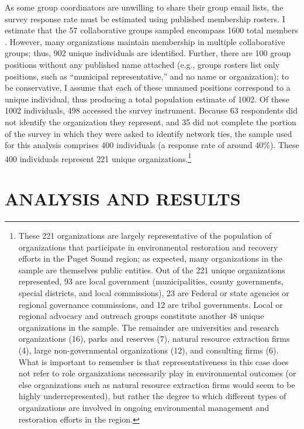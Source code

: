 \documentclass[12pt,a4paper,titlepage]{article}
\begin{document}
As some group coordinators are unwilling to share their group email lists, the survey response rate must be estimated using published membership rosters. I estimate that the 57 collaborative groups sampled encompass 1600 total members \parencite[see also][]{scott2015}. However, many organizations maintain membership in multiple collaborative groups; thus, 902 unique individuals are identified. Further, there are 100 group positions without any published name attached (e.g., groups rosters list only positions, such as “municipal representative,'' and no name or organization); to be conservative, I assume that each of these unnamed positions correspond to a unique individual, thus producing a total population estimate of 1002. Of these 1002 individuals, 498 accessed the survey instrument. Because 63 respondents did not identify the organization they represent, and 35 did not complete the portion of the survey in which they were asked to identify network ties, the sample used for this analysis comprises 400 individuals (a response rate of around 40\%). These 400 individuals represent 221 unique organizations.\footnote{These 221 organizations are largely representative of the population of organizations that participate in environmental restoration and recovery efforts in the Puget Sound region; as expected, many organizations in the sample are themselves public entities. Out of the 221 unique organizations represented, 93 are local government (municipalities, county governments, special districts, and local commissions), 23 are Federal or state agencies or regional governance commissions, and 12 are tribal governments. Local or regional advocacy and outreach groups constitute another 48 unique organizations in the sample. The remainder are universities and research organizations (16), parks and reserves (7), natural resource extraction firms (4), large non-governmental organizations (12), and consulting firms (6). What is important to remember is that representativeness in this case does not refer to role organizations necessarily play in environmental outcomes (or else organizations such as natural resource extraction firms would seem to be highly underrepresented), but rather the degree to which different types of organizations are involved in ongoing environmental management and restoration efforts in the region.}


\section{\bf\MakeUppercase{Analysis and Results}}
\end{document}
